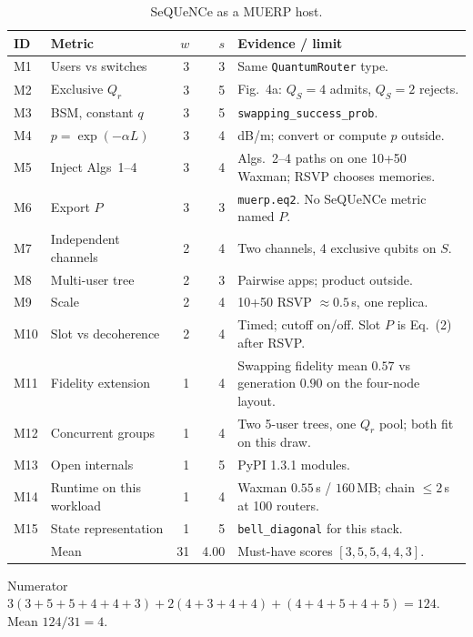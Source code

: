 \documentclass[11pt]{article}
\begin{document}
\begin{table}[h]
\centering
\caption{SeQUeNCe as a MUERP host.}
\label{tab:score}
{\small
\begin{tabularx}{\textwidth}{@{}l P{1.2in} r r Y@{}}
\toprule
ID & Metric & $w$ & $s$ & Evidence / limit \\
\midrule
M1 & Users vs switches & 3 & 3 & Same \texttt{QuantumRouter} type. \\
M2 & Exclusive $Q_r$ & 3 & 5 & Fig.~4a: $Q_S=4$ admits, $Q_S=2$ rejects. \\
M3 & BSM, constant $q$ & 3 & 5 & \texttt{swapping\_success\_prob}. \\
M4 & $p=\exp(-\alpha L)$ & 3 & 4 & dB/m; convert or compute $p$ outside. \\
M5 & Inject Algs~1--4 & 3 & 4 & Algs.~2--4 paths on one 10+50 Waxman; RSVP chooses memories. \\
M6 & Export $P$ & 3 & 3 & \texttt{muerp.eq2}. No SeQUeNCe metric named $P$. \\
M7 & Independent channels & 2 & 4 & Two channels, 4 exclusive qubits on $S$. \\
M8 & Multi-user tree & 2 & 3 & Pairwise apps; product outside. \\
M9 & Scale & 2 & 4 & 10+50 RSVP $\approx 0.5$\,s, one replica. \\
M10 & Slot vs decoherence & 2 & 4 & Timed; cutoff on/off. Slot $P$ is Eq.~(2) after RSVP. \\
M11 & Fidelity extension & 1 & 4 & Swapping fidelity mean $0.57$ vs generation $0.90$ on the four-node layout. \\
M12 & Concurrent groups & 1 & 4 & Two 5-user trees, one $Q_r$ pool; both fit on this draw. \\
M13 & Open internals & 1 & 5 & PyPI 1.3.1 modules. \\
M14 & Runtime on this workload & 1 & 4 & Waxman $0.55$\,s / $160$\,MB; chain $\le 2$\,s at 100 routers. \\
M15 & State representation & 1 & 5 & \texttt{bell\_diagonal} for this stack. \\
\midrule
 & Mean & 31 & 4.00 & Must-have scores $[3,5,5,4,4,3]$. \\
\bottomrule
\end{tabularx}}
\end{table}

Numerator $3(3+5+5+4+4+3)+2(4+3+4+4)+(4+4+5+4+5)=124$. Mean $124/31=4$.

\end{document}
